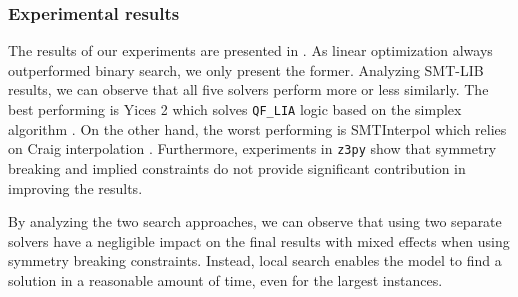 \subsubsection{Experimental results}

The results of our experiments are presented in . As linear optimization always outperformed binary search, we only present the former.
Analyzing SMT-LIB results, we can observe that all five solvers perform more or less similarly. The best performing is Yices 2 which solves \texttt{QF\_LIA} logic based on the simplex algorithm \cite{yices2}. On the other hand, the worst performing is SMTInterpol which relies on Craig interpolation \cite{smtinterpol}.
Furthermore, experiments in \texttt{z3py} show that symmetry breaking and implied constraints do not provide significant contribution in improving the results.

By analyzing the two search approaches, we can observe that using two separate solvers have a negligible impact on the final results with mixed effects when using symmetry breaking constraints. Instead, local search enables the model to find a solution in a reasonable amount of time, even for the largest instances.

